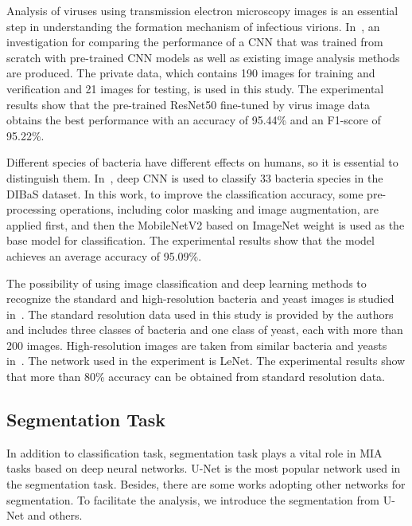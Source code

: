 Analysis of viruses using transmission electron microscopy images is an essential step in understanding the formation mechanism of infectious virions. In~\cite{Devan-2019-DHCT}, an investigation for comparing the performance of a CNN that was trained from scratch with pre-trained CNN models as well as existing image analysis methods are produced. The private data, which contains 190 images for training and verification and 21 images for testing, is used in this study. The experimental results show that the pre-trained ResNet50 fine-tuned by virus image data obtains the best performance with an accuracy of 95.44\% and an F1-score of 95.22\%.

Different species of bacteria have different effects on humans, so it is essential to distinguish them. In~\cite{Rujichan-2019-BCUI}, deep CNN is used to classify 33 bacteria species in the DIBaS dataset. In this work, to improve the classification accuracy, some pre-processing operations, including color masking and image augmentation, are applied first, and then the MobileNetV2 based on ImageNet weight is used as the base model for classification. The experimental results show that the model achieves an average accuracy of 95.09\%.

The possibility of using image classification and deep learning methods to recognize the standard and high-resolution bacteria and yeast images is studied in~\cite{Treebupachatsakul-2020-MIRB}. The standard resolution data used in this study is provided by the authors and includes three classes of bacteria and one class of yeast, each with more than 200 images. High-resolution images are taken from similar bacteria and yeasts in~\cite{Zielinski-2017-ALAB}. The network used in the experiment is LeNet. The experimental results show that more than 80\% accuracy can be obtained from standard resolution data.

\subsection{Segmentation Task}
In addition to classification task, segmentation task plays a vital role in MIA tasks based on deep neural networks. U-Net is the most popular network used in the segmentation task. Besides, there are some works adopting other networks for segmentation. To facilitate the analysis, we introduce the segmentation from U-Net and others.
 

